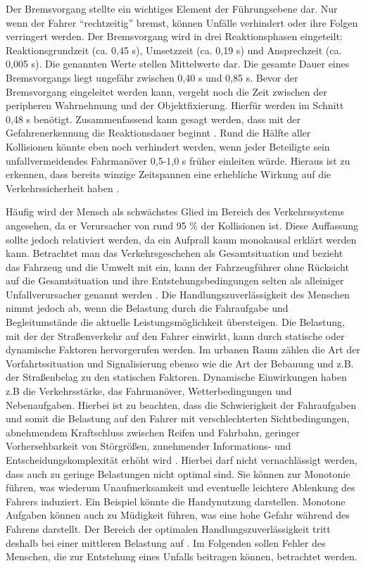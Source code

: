 Der Bremsvorgang stellte ein wichtiges Element der Führungsebene dar. Nur wenn der Fahrer \enquote{rechtzeitig} bremst, können Unfälle verhindert oder ihre Folgen verringert werden. Der Bremsvorgang wird in drei Reaktionsphasen eingeteilt: Reaktionsgrundzeit (ca. 0,45 s), Umsetzzeit (ca. 0,19 s) und Ansprechzeit (ca. 0,005 s). Die genannten Werte stellen Mittelwerte dar. Die gesamte Dauer eines Bremsvorgangs liegt ungefähr zwischen 0,40 s und 0,85 s. Bevor der Bremsvorgang eingeleitet werden kann, vergeht noch die Zeit zwischen der peripheren Wahrnehmung und der Objektfixierung. Hierfür werden im Schnitt 0,48 s benötigt. Zusammenfassend kann gesagt werden, dass mit der Gefahrenerkennung die Reaktionsdauer beginnt \parencite[S.153]{Burg.2017}. Rund die Hälfte aller Kollisionen könnte eben noch verhindert werden, wenn jeder Beteiligte sein unfallvermeidendes Fahrmanöver 0,5-1,0 s früher einleiten würde. Hieraus ist zu erkennen, dass bereits winzige Zeitspannen eine erhebliche Wirkung auf die Verkehrssicherheit haben \parencite[S. 271]{Burg.2017}.

Häufig wird der Mensch als schwächstes Glied im Bereich des Verkehrssystems angesehen, da er Verursacher von rund 95 \% der Kollisionen ist. Diese Auffassung sollte jedoch relativiert werden, da ein Aufprall kaum monokausal erklärt werden kann. Betrachtet man das Verkehrsgeschehen als Gesamtsituation und bezieht das Fahrzeug und die Umwelt mit ein, kann der Fahrzeugführer ohne Rücksicht auf die Gesamtsituation und ihre Entstehungsbedingungen selten als alleiniger Unfallverursacher genannt werden \parencite[S. 269]{Burg.2017}. Die Handlungszuverlässigkeit des Menschen nimmt jedoch ab, wenn die Belastung durch die Fahraufgabe und Begleitumstände die aktuelle Leistungsmöglichkeit übersteigen. Die Belastung, mit der der Straßenverkehr auf den Fahrer einwirkt, kann durch statische oder dynamische Faktoren hervorgerufen werden. Im urbanen Raum zählen die Art der Vorfahrtssituation und Signalisierung ebenso wie die Art der Bebauung und z.B. der Straßenbelag zu den statischen Faktoren. Dynamische Einwirkungen haben z.B die Verkehrsstärke, das Fahrmanöver, Wetterbedingungen und Nebenaufgaben. Hierbei ist zu beachten, dass die Schwierigkeit der Fahraufgaben und somit die Belastung auf den Fahrer mit verschlechterten Sichtbedingungen, abnehmendem Kraftschluss zwischen Reifen und Fahrbahn, geringer Vorhersehbarkeit von Störgrößen, zunehmender Informations- und Entscheidungskomplexität erhöht wird \parencite[S. 132]{Reichart.2001}. Hierbei darf nicht vernachlässigt werden, dass auch zu geringe Belastungen nicht optimal sind. Sie können zur Monotonie führen, was wiederum Unaufmerksamkeit und eventuelle leichtere Ablenkung des Fahrers induziert. Ein Beispiel könnte die Handynutzung darstellen. Monotone Aufgaben können auch zu Müdigkeit führen, was eine hohe Gefahr während des Fahrens darstellt. Der Bereich der optimalen Handlungszuverlässigkeit tritt deshalb bei einer mittleren Belastung auf \parencite[S. 270]{Burg.2017}. Im Folgenden sollen Fehler des Menschen, die zur Entstehung eines Unfalls beitragen können, betrachtet werden.

